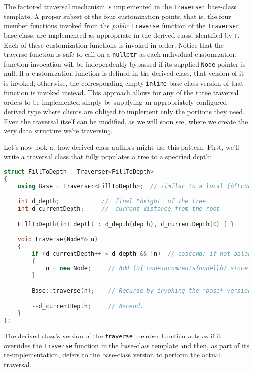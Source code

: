\noindent The factored traversal mechanism is implemented in the
\texttt{Traverser} base-class template. A proper subset of the four
customization points, that is, the four member functions invoked from
the \emph{public} \texttt{traverse} function of the \texttt{Traverser}
base class, are implemented as appropriate in the derived class,
identified by \texttt{T}. Each of these customization functions is
invoked in order. Notice that the traverse function is safe to call on a
\texttt{nullptr} as each individual customization-function invocation
will be independently bypassed if its supplied \texttt{Node} pointer is
null. If a customization function is defined in the derived class, that
version of it is invoked; otherwise, the corresponding empty
\texttt{inline} base-class version of that function is invoked instead.
This approach allows for any of the three traversal orders to be
implemented simply by supplying an appropriately configured derived type
where clients are obliged to implement only the portions they need. Even
the traversal itself can be modified, as we will soon see, where we
create the very data structure we're traversing.

Let's now look at how derived-class authors might use this pattern.
First, we'll write a traversal class that fully populates a tree to a
specified depth:

\begin{lstlisting}[language=C++]
struct FillToDepth : Traverser<FillToDepth>
{
    using Base = Traverser<FillToDepth>;  // similar to a local (ù{\codeincomments{typedef}}ù)

    int d_depth;            //  final "height" of the tree
    int d_currentDepth;     //  current distance from the root

    FillToDepth(int depth) : d_depth(depth), d_currentDepth(0) { }

    void traverse(Node*& n)
    {
        if (d_currentDepth++ < d_depth && !n)  // descend; if not balanced...
        {
            n = new Node;     // Add (ù{\codeincomments{node}}ù) since it's not already there.
        }

        Base::traverse(n);    // Recurse by invoking the *base* version.

        --d_currentDepth;     // Ascend.
    }
};
\end{lstlisting}

\noindent The derived class's version of the \texttt{traverse} member function
acts as if it overrides the \texttt{traverse} function in the base-class
template and then, as part of its re-implementation, defers to the base-class version to perform the actual traversal.

